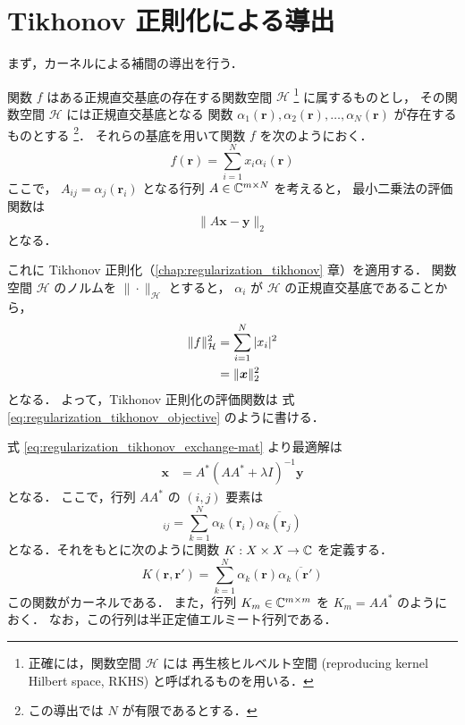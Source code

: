 %

\section{Tikhonov 正則化による導出}\label{sec:interp_kernel_tikhonov}

まず，カーネルによる補間の導出を行う．

関数 $f$ はある正規直交基底の存在する関数空間 $\mathcal{H}$
\footnote{正確には，関数空間 $\mathcal{H}$ には%
    再生核ヒルベルト空間 (reproducing kernel Hilbert space, RKHS)%
    と呼ばれるものを用いる．}
に属するものとし，
その関数空間 $\mathcal{H}$ には正規直交基底となる
関数 $\alpha_1(\bm{r}), \alpha_2(\bm{r}), \ldots, \alpha_N(\bm{r})$ が存在するものとする
\footnote{この導出では $N$ が有限であるとする．}．
それらの基底を用いて関数 $f$ を次のようにおく．
\begin{equation}
    f(\bm{r}) = \sum_{i = 1}^{N} x_i \alpha_i(\bm{r})
\end{equation}
ここで，
$A_{ij} = \alpha_j(\bm{r}_i)$ となる行列 $A \in \mathbb{C}^{m \times N}$ を考えると，
最小二乗法の評価関数は
\begin{equation}
    \|A \bm{x} - \bm{y}\|_2
\end{equation}
となる．

これに Tikhonov 正則化（\ref{chap:regularization_tikhonov} 章）を適用する．
関数空間 $\mathcal{H}$ のノルムを $\|\cdot\|_{\mathcal{H}}$ とすると，
$\alpha_i$ が $\mathcal{H}$ の正規直交基底であることから，
\begin{align}
    \|f\|_{\mathcal{H}}^2
     & = \sum_{i = 1}^{N} |x_i|^2 \notag \\
     & = \|\bm{x}\|_2^2
\end{align}
となる．
よって，Tikhonov 正則化の評価関数は
式 \eqref{eq:regularization_tikhonov_objective} のように書ける．

式 \eqref{eq:regularization_tikhonov_exchange-mat} より最適解は
\begin{align}
    \bm{x} & = A^* (AA^* + \lambda I)^{-1} \bm{y}
\end{align}
となる．
ここで，行列 $AA^*$ の $(i, j)$ 要素は
\begin{equation}
    [AA^*]_{ij} = \sum_{k = 1}^{N} \alpha_k(\bm{r}_i) \overline{\alpha_k(\bm{r}_j)}
\end{equation}
となる．それをもとに次のように関数 $K : X \times X \to \mathbb{C}$ を定義する．
\begin{equation}
    K(\bm{r}, \bm{r}') = \sum_{k = 1}^{N} \alpha_k(\bm{r}) \overline{\alpha_k(\bm{r}')}
\end{equation}
この関数がカーネルである．
また，行列 $K_m \in \mathbb{C}^{m \times m}$ を
$K_m = AA^*$ のようにおく．
なお，この行列は半正定値エルミート行列である．

